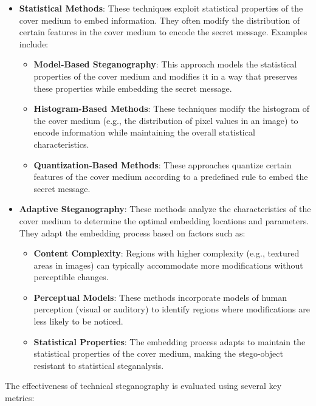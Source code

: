 \documentclass[12pt, a4paper, oneside]{book}
\begin{document}
\begin{itemize}[leftmargin=*]
    \item \textbf{Statistical Methods}: These techniques exploit statistical properties of the cover medium to embed information. They often modify the distribution of certain features in the cover medium to encode the secret message. Examples include:
    \begin{itemize}
        \item \textbf{Model-Based Steganography}: This approach models the statistical properties of the cover medium and modifies it in a way that preserves these properties while embedding the secret message.
        \item \textbf{Histogram-Based Methods}: These techniques modify the histogram of the cover medium (e.g., the distribution of pixel values in an image) to encode information while maintaining the overall statistical characteristics.
        \item \textbf{Quantization-Based Methods}: These approaches quantize certain features of the cover medium according to a predefined rule to embed the secret message.
    \end{itemize}

    \item \textbf{Adaptive Steganography}: These methods analyze the characteristics of the cover medium to determine the optimal embedding locations and parameters. They adapt the embedding process based on factors such as:
    \begin{itemize}
        \item \textbf{Content Complexity}: Regions with higher complexity (e.g., textured areas in images) can typically accommodate more modifications without perceptible changes.
        \item \textbf{Perceptual Models}: These methods incorporate models of human perception (visual or auditory) to identify regions where modifications are less likely to be noticed.
        \item \textbf{Statistical Properties}: The embedding process adapts to maintain the statistical properties of the cover medium, making the stego-object resistant to statistical steganalysis.
    \end{itemize}
\end{itemize}

The effectiveness of technical steganography is evaluated using several key metrics:
\end{document}
